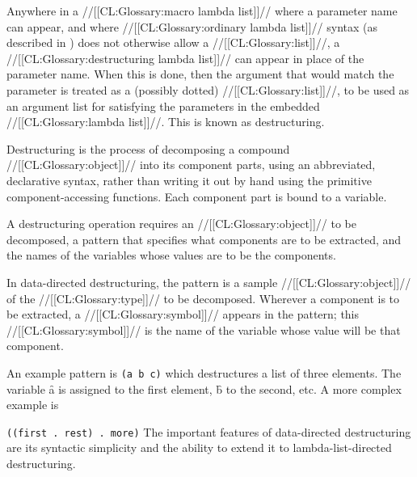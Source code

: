 Anywhere in a //[[CL:Glossary:macro lambda list]]// where a parameter name can appear, and where //[[CL:Glossary:ordinary lambda list]]// syntax (as described in \secref\OrdinaryLambdaLists) does not  otherwise allow a //[[CL:Glossary:list]]//, a //[[CL:Glossary:destructuring lambda list]]//  can appear in place of the parameter name.  When this is done, then the argument  that would match the parameter is treated as a (possibly dotted) //[[CL:Glossary:list]]//, to be used as an argument list for satisfying the parameters in the embedded //[[CL:Glossary:lambda list]]//. This is known as destructuring.
 

Destructuring is the process of decomposing a compound //[[CL:Glossary:object]]// into its component parts, using an abbreviated, declarative syntax, rather than writing it out by hand using the primitive component-accessing functions.  Each component part is bound to a variable.

 

 

  A destructuring operation requires an //[[CL:Glossary:object]]// to be decomposed,  a pattern that specifies what components are to be extracted, and the names of the variables whose values are to be the components.


In data-directed destructuring, the pattern is a sample //[[CL:Glossary:object]]// of the //[[CL:Glossary:type]]// to be decomposed. Wherever a component is to be extracted,  a //[[CL:Glossary:symbol]]// appears in the pattern;  this //[[CL:Glossary:symbol]]// is the name of the variable whose value will be that component.


An example pattern is
  {\tt 	(a b c)}
  which destructures a list of three elements.  The variable \f{a} is assigned to the first element, \f{b} to the second, etc.  A more complex example is

{\tt 	((first . rest) . more)}
  The important features of data-directed destructuring are its syntactic simplicity and the ability to extend it to lambda-list-directed destructuring.

\endsubsubsubsubsection%

\endsubsubsubsection%

